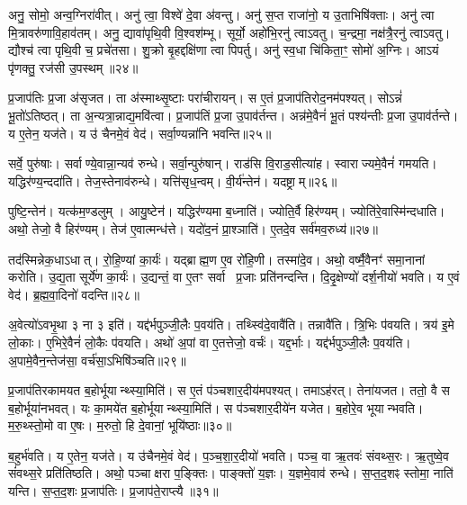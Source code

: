 अनु॒ सोमो॒ अन्व॒ग्निरा॑वीत्।
अनु॑ त्वा॒ विश्वे॑ दे॒वा अ॑वन्तु।
अनु॑ स॒प्त राजा॑नो॒ य उ॒ताभिषि॑क्ताः।
अनु॑ त्वा मि॒त्रावरु॑णावि॒हाव॑तम्।
अनु॒ द्यावा॑पृथि॒वी वि॒श्वश॑म्भू।
सूर्यो॒ अहो॑भि॒रनु॑ त्वाऽवतु।
च॒न्द्रमा॒ नक्ष॑त्रै॒रनु॑ त्वाऽवतु।
द्यौश्च॑ त्वा पृथि॒वी च॒ प्रचे॑तसा।
शु॒क्रो बृ॒हद्दक्षि॑णा त्वा पिपर्तु।
अनु॑ स्व॒धा चि॑किता॒ꣳ॒ सोमो॑ अ॒ग्निः।
आऽयं पृ॑णक्तु॒ रज॑सी उ॒पस्थम्॥२४॥\anuvakamend[बृह॒स्पतिः॒ सोमो॑ अ॒ग्निरेकं॑ च]

प्र॒जाप॑तिः प्र॒जा अ॑सृजत।
ता अ॑स्माथ्सृ॒ष्टाः परा॑चीरायन्।
स ए॒तं प्र॒जाप॑तिरोद॒नम॑पश्यत्।
सोऽन्नं॑ भू॒तो॑\-ऽतिष्ठत्।
ता अ॒न्यत्रा॒न्नाद्य॒मवि॑त्वा।
प्र॒जाप॑तिं प्र॒जा उ॒पाव॑र्तन्त।
अन्न॑मे॒वैनं॑ भू॒तं पश्य॑न्तीः प्र॒जा उ॒पाव॑र्तन्ते।
य ए॒तेन॒ यज॑ते।
य उ॑ चैनमे॒वं वेद॑।
सर्वा॒ण्यन्ना॑नि भवन्ति॥२५॥

सर्वे॒ पुरु॑षाः।
सर्वाण्ये॒वान्ना॒न्यव॑ रुन्धे।
सर्वा॒न्पुरु॑षान्।
राड॑सि वि॒राड॒सीत्या॑ह।
स्वाराज्यमे॒वैनं॑ गमयति।
यद्धिर॑ण्य॒न्ददा॑ति।
तेज॒स्तेनाव॑रुन्धे।
यत्ति॑सृध॒न्वम्।
वी॒र्य॑न्तेन॑।
यदष्ट्राम्॥२६॥

पुष्टि॒न्तेन॑।
यत्क॑म॒ण्डलुम्।
आयु॒ष्टेन॑।
यद्धिर॑ण्यमा ब॒ध्नाति॑।
ज्योति॒र्वै हिर॑ण्यम्।
ज्योति॑रे॒वास्मि॑न्दधाति।
अथो॒ तेजो॒ वै हिर॑ण्यम्।
तेज॑ ए॒वात्मन्ध॑त्ते।
यदो॑द॒नं प्रा॒श्ञाति॑।
ए॒तदे॒व सर्व॑मव॒रुध्य॑॥२७॥

तद॑स्मिन्नेक॒धा\-ऽधात्।
रो॒हि॒ण्यां का॒र्यः॑।
यद्ब्राह्म॒ण ए॒व रो॑हि॒णी।
तस्मा॑दे॒व।
अथो॒ वर्ष्मै॒वैनꣳ॑ समा॒नानां करोति।
उ॒द्य॒ता सूर्ये॑ण का॒र्यः॑।
उ॒द्यन्तं॒ वा ए॒तꣳ सर्वा प्र॒जाः प्रति॑नन्दन्ति।
दि॒दृ॒क्षेण्यो॑ दर्\mbox{}श॒नीयो॑ भवति।
य ए॒वं वेद॑।
ब्र॒ह्म॒वा॒दिनो॑ वदन्ति॥२८॥

अ॒वेत्यो॑\-ऽवभृ॒था ३ ना ३ इति॑।
यद्द॑र्भपुञ्जी॒लैः प॒वय॑ति।
तथ्स्वि॑दे॒वावै॑ति।
तन्नावै॑ति।
त्रि॒भिः प॑वयति।
त्रय॑ इ॒मे लो॒काः।
ए॒भिरे॒वैनं॑ लो॒कैः प॑वयति।
अथो॑ अ॒पां वा ए॒तत्तेजो॒ वर्चः॑।
यद्द॒र्भाः।
यद्द॑र्भपुञ्जी॒लैः प॒वय॑ति।
अ॒पामे॒वैन॒न्तेज॑सा॒ वर्च॑सा॒\-ऽभिषि॑ञ्चति॥२९॥\anuvakamend[भ॒व॒न्त्यष्ट्रा॑मव॒रुध्य॑ वदन्ति द॒र्भा यद्द॑र्भपुञ्जी॒लैः प॒वय॒त्येकं॑ च]

प्र॒जाप॑तिरकामयत ब॒होर्भूयान्थ्स्या॒मिति॑।
स ए॒तं प॑ञ्चशार॒दीय॑मपश्यत्।
तमाऽह॑रत्।
तेना॑यजत।
ततो॒ वै स ब॒होर्भूया॑नभवत्।
यः का॒मये॑त ब॒होर्भूयान्थ्स्या॒मिति॑।
स प॑ञ्चशार॒दीये॑न यजेत।
ब॒होरे॒व भूयान्भवति।
म॒रु॒थ्स्तो॒मो वा ए॒षः।
म॒रुतो॒ हि दे॒वानां॒ भूयि॑ष्ठाः॥३०॥

ब॒हुर्भ॑वति।
य ए॒तेन॒ यज॑ते।
य उ॑चैनमे॒वं वेद॑।
प॒ञ्च॒शा॒र॒दीयो॑ भवति।
पञ्च॒ वा ऋ॒तवः॑ संवथ्स॒रः।
ऋ॒तुष्वे॒व सं॑वथ्स॒रे प्रति॑तिष्ठति।
अथो॒ पञ्चाक्षरा प॒ङ्क्तिः।
पाङ्क्तो॑ य॒ज्ञः।
य॒ज्ञमे॒वाव॑ रुन्धे।
स॒प्त॒द॒शꣴ स्तोमा॒ नाति॑ यन्ति।
स॒प्त॒द॒शः प्र॒जाप॑तिः।
प्र॒जाप॑ते॒राप्त्यै॥३१॥\anuvakamend[भूयि॑ष्ठा यन्ति॒ द्वे च॑]

